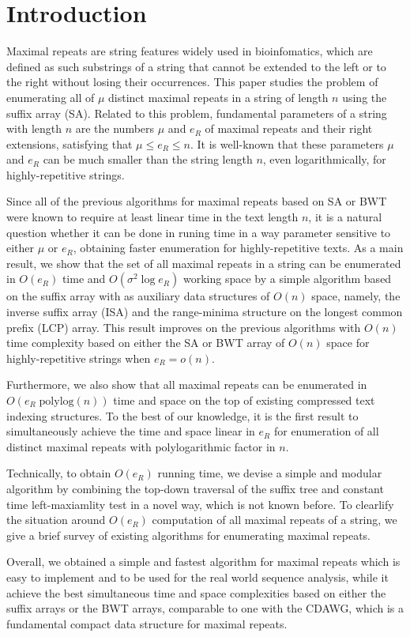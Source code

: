 \section{Introduction}
\label{sec:intro}
Maximal repeats are string features widely used in bioinfomatics, which are defined as such substrings of a string that cannot be extended to the left or to the right without losing their occurrences. 
This paper studies the problem of enumerating all of $\mu$ distinct maximal repeats in a string of length $n$ using the suffix array (SA). 
Related to this problem, fundamental parameters of a string with length $n$ are the numbers $\mu$ and $e_R$ of maximal repeats and their right extensions, satisfying that $\mu \le e_R\le n$. 
It is well-known that these parameters $\mu$ and $e_R$ can be much smaller than the string length $n$, even logarithmically, for highly-repetitive strings. 

Since all of the previous algorithms for maximal repeats based on SA or BWT were known to require at least linear time in the text length $n$, it is a natural question whether it can be done in runing time in a way parameter sensitive to either $\mu$ or $e_R$, obtaining faster enumeration for highly-repetitive texts. 
As a main result, we show that the set of all maximal repeats in a string can be enumerated in $O(e_R)$ time and $O(\sigma^2 \log e_R)$ working space by a simple algorithm based on the suffix array with as auxiliary data structures of $O(n)$ space, namely, the inverse suffix array (ISA) and the range-minima structure on the longest common prefix (LCP) array. This result improves on the previous algorithms with $O(n)$ time complexity based on either the SA or BWT array of $O(n)$ space for highly-repetitive strings when $e_R = o(n)$. 

Furthermore, we also show that all maximal repeats can be enumerated in $O(e_R \;\textrm{polylog}(n))$ time and space on the top of existing compressed text indexing structures.
To the best of our knowledge, it is the first result to simultaneously achieve the time and space linear in $e_R$ for enumeration of all distinct maximal repeats with polylogarithmic factor in $n$. 

Technically, to obtain $O(e_R)$ running time, we devise a simple and modular algorithm by combining the top-down traversal of the suffix tree and constant time left-maxiamlity test in a novel way, which is not known before. To clearlify the situation around $O(e_R)$ computation of all maximal repeats of a string, we give a brief survey of existing algorithms for enumerating maximal repeats.

Overall, we obtained a simple and fastest algorithm for maximal repeats which is easy to implement and to be used for the real world sequence analysis, while it achieve the best simultaneous time and space complexities based on either the suffix arrays or the BWT arrays, comparable to one with the CDAWG, which is a fundamental compact data structure for maximal repeats. 

